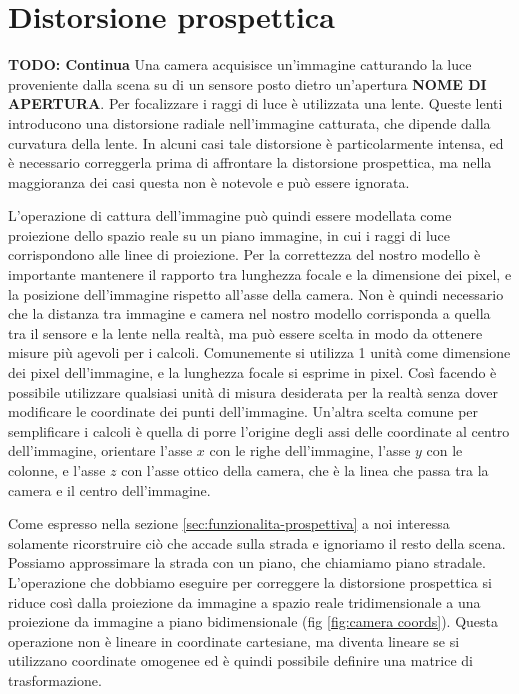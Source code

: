 \chapter{Distorsione prospettica}
\label{sec:prospettiva}

\textbf{TODO: Continua}
Una camera acquisisce un'immagine catturando la luce proveniente dalla scena su di un sensore posto dietro un'apertura \textbf{NOME DI APERTURA}.
Per focalizzare i raggi di luce è utilizzata una lente.
Queste lenti introducono una distorsione radiale nell'immagine catturata, che dipende dalla curvatura della lente.
In alcuni casi tale distorsione è particolarmente intensa, ed è necessario correggerla prima di affrontare la distorsione prospettica, ma nella maggioranza dei casi questa non è notevole e può essere ignorata.

L'operazione di cattura dell'immagine può quindi essere modellata come proiezione dello spazio reale su un piano immagine, in cui i raggi di luce corrispondono alle linee di proiezione.
Per la correttezza del nostro modello è importante mantenere il rapporto tra lunghezza focale e la dimensione dei pixel, e la posizione dell'immagine rispetto all'asse della camera.
Non è quindi necessario che la distanza tra immagine e camera nel nostro modello corrisponda a quella tra il sensore e la lente nella realtà, ma può essere scelta in modo da ottenere misure più agevoli per i calcoli.
Comunemente si utilizza 1 unità come dimensione dei pixel dell'immagine, e la lunghezza focale si esprime in pixel.
Così facendo è possibile utilizzare qualsiasi unità di misura desiderata per la realtà senza dover modificare le coordinate dei punti dell'immagine.
Un'altra scelta comune per semplificare i calcoli è quella di porre l'origine degli assi delle coordinate al centro dell'immagine, orientare l'asse $x$ con le righe dell'immagine, l'asse $y$ con le colonne, e l'asse $z$ con l'asse ottico della camera, che è la linea che passa tra la camera e il centro dell'immagine.

Come espresso nella sezione \ref{sec:funzionalita-prospettiva} a noi interessa solamente ricorstruire ciò che accade sulla strada e ignoriamo il resto della scena.
Possiamo approssimare la strada con un piano, che chiamiamo piano stradale.
L'operazione che dobbiamo eseguire per correggere la distorsione prospettica si riduce così dalla proiezione da immagine a spazio reale tridimensionale a una proiezione da immagine a piano bidimensionale (fig \ref{fig:camera coords}).
Questa operazione non è lineare in coordinate cartesiane, ma diventa lineare se si utilizzano coordinate omogenee ed è quindi possibile definire una matrice di trasformazione.

